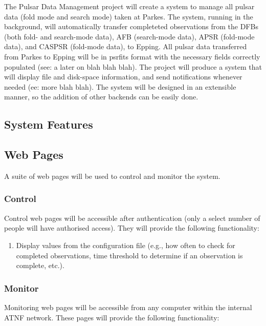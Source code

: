\documentclass[a4paper,11pt]{article}
\begin{document}
The Pulsar Data Management project will create a system to manage all pulsar data (fold mode and search mode) taken at Parkes. The system, running in the background, will automatically transfer completeted observations from the DFBs (both fold- and search-mode data), AFB (search-mode data), APSR (fold-mode data), and CASPSR (fold-mode data), to Epping. All pulsar data transferred from Parkes to Epping will be in psrfits format with the necessary fields correctly populated (see: a later on blah blah blah). The project will produce a system that will display file and disk-space information, and send notifications whenever needed (ee: more blah blah). The system will be designed in an extensible manner, so the addition of other backends can be easily done.

\subsection{System Features}

\subsection{Web Pages}
A suite of web pages will be used to control and monitor the system.

\subsubsection{Control}
Control web pages will be accessible after authentication (only a select number of people will have authorised access). They will provide the following functionality:

\begin{enumerate}
\item Display values from the configuration file (e.g., how often to check for completed observations, time threshold to determine if an observation is complete, etc.).
\end{enumerate}

\subsubsection{Monitor}
Monitoring web pages will be accessible from any computer within the internal ATNF network. These pages will provide the following functionality:
\end{document}
